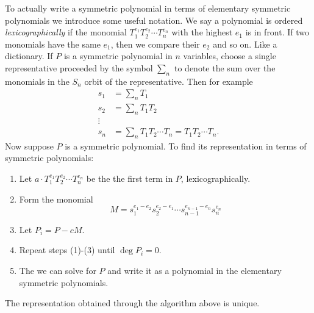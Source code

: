 \documentclass{article}
\theoremstyle{remark}
\begin{document}
    To actually write a symmetric polynomial in terms of elementary symmetric polynomials we introduce some useful notation.
    We say a polynomial is ordered \textit{lexicographically} if the monomial $T_1^{e_1}T_2^{e_2}\cdots T_n^{e_n}$ with the highest $e_1$ is in front.
    If two monomials have the same $e_1$, then we compare their $e_2$ and so on. Like a dictionary.
    If $P$ is a symmetric polynomial in $n$ variables, choose a single representative proceeded by the symbol $\sum_n$ to denote the sum over the monomials in the $S_n$ orbit of the representative.
    Then for example
    \begin{align*}
        s_1&=\sum_n T_1\\
        s_2&=\sum_n T_1T_2\\
        \vdots&\\
        s_n&=\sum_n T_1T_2\cdots T_n=T_1T_2\cdots T_n.
    \end{align*}
    Now suppose $P$ is a symmetric polynomial. To find its representation in terms of symmetric polynomials:
    \begin{enumerate}
        \item Let $a\cdot T_1^{e_1}T_2^{e_2}\cdots T_n^{e_n}$ be the the first term in $P$, lexicographically.
        \item Form the monomial $$M = s_1^{e_1-e_2}s_2^{e_2-e_1}\cdots s_{n-1}^{e_{n-1}-e_n}s_n^{e_n}$$
        \item Let $P_i = P -cM$.
        \item Repeat steps (1)-(3) until $\deg P_i = 0$.
        \item The we can solve for $P$ and write it as a polynomial in the elementary symmetric polynomials.
    \end{enumerate}
    The representation obtained through the algorithm above is unique.
\end{document}
